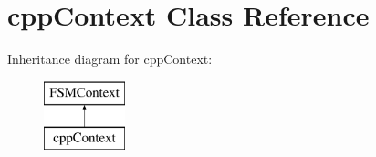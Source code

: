 \hypertarget{classcpp_context}{\section{cpp\-Context Class Reference}
\label{classcpp_context}
}
Inheritance diagram for cpp\-Context\-:\begin{figure}[H]
\begin{center}
\leavevmode
\includegraphics[height=2.000000cm]{classcpp_context}
\end{center}
\end{figure}
